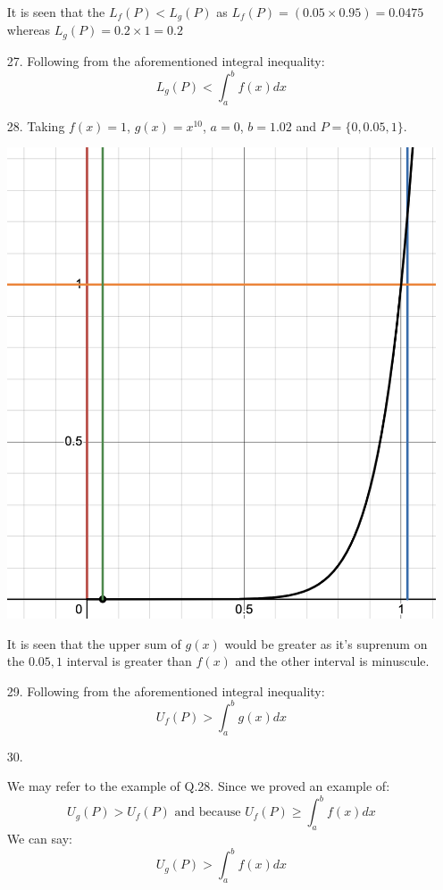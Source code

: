 \documentclass[12pt]{article}
\begin{document}
\begin{enumerate}[start=1,label={\bfseries. },leftmargin=1in]
It is seen that the $L_f(P) < L_g(P)$ as $L_f(P) = (0.05\times0.95 ) = 0.0475$ whereas $L_g(P) = 0.2 \times 1 = 0.2$

\item [27. ]
Following from the aforementioned integral inequality:
\[
L_g(P) < \int_a^b f(x)dx
\]

\item [28. ] Taking $f(x) = 1$, $g(x) = x^{10}$, $a = 0$, $b = 1.02$ and $P = \{0, 0.05, 1\}$.

\includegraphics[width=0.5\linewidth]{Math 134//Images/28.png}

It is seen that the upper sum of $g(x)$ would be greater as it's suprenum on the $0.05, 1$ interval is greater than $f(x)$ and the other interval is minuscule.

\item [29. ]
Following from the aforementioned integral inequality:
\[
U_f(P) > \int_a^b g(x)dx
\]
\item [30. ]

We may refer to the example of Q.28. Since we proved an example of:
\[
U_g(P) > U_f(P) \text{ and because } U_f(P) \geq \int_a^bf(x) dx
\]
We can say:
\[
U_g(P) > \int_a^bf(x) dx
\]

\end{enumerate}
\end{document}
